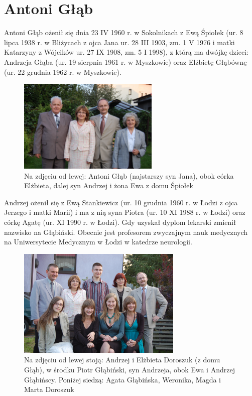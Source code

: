 \section{Antoni Głąb}
Antoni Głąb ożenił się dnia 23 IV 1960 r. w Sokolnikach z Ewą Śpiołek (ur. 8 lipca 1938 r. w Bliżycach z ojca Jana ur. 28 III 1903, zm. 1 V 1976 i matki Katarzyny z Wójcików ur. 27 IX 1908, zm. 5 I 1998), z którą ma dwójkę dzieci: Andrzeja Głąba (ur. 19 sierpnia 1961 r. w Myszkowie) oraz Elżbietę Głąbównę (ur. 22 grudnia 1962 r. w Myszkowie).


\begin{figure}[!h]
\begin{center}
\includegraphics[width=0.6\textwidth]{zdjecia/ewa_antoni_glab_z_dziecmi.jpg}
\caption[Antoni Głąb z żoną i dziećmi]{Na zdjęciu od lewej: Antoni Głąb (najstarszy syn Jana), obok córka Elżbieta, dalej syn Andrzej i żona Ewa z domu Śpiołek}
\label{rys:ewa_antoni_glab_z_dziecmi}
\end{center}
\end{figure}

Andrzej ożenił się z Ewą Stankiewicz (ur. 10 grudnia 1960 r. w Łodzi z ojca Jerzego i matki Marii) i ma z nią syna Piotra (ur. 10 XI 1988 r. w Łodzi) oraz córkę Agatę (ur. XI 1990 r. w Łodzi). Gdy uzyskał dyplom lekarski zmienił nazwisko na Głąbiński. Obecnie jest profesorem zwyczajnym nauk medycznych na Uniwersytecie Medycznym w Łodzi w katedrze neurologii.

\begin{figure}[!h]
\begin{center}
\includegraphics[width=0.7\textwidth]{zdjecia/elzbieta_anrzej_glab_z_dziecmi.jpg}
\caption[Elżbieta Doroszuk i Andrzej Głąbiński z rodzinami]{Na zdjęciu od lewej stoją: Andrzej i Elżbieta Doroszuk (z domu Głąb), w środku Piotr Głąbiński, syn Andrzeja, obok Ewa i Andrzej Głąbińscy. Poniżej siedzą: Agata Głąbińska, Weronika, Magda i Marta Doroszuk}
\label{rys:elzbieta_anrzej_glab_z_dziecmi}
\end{center}
\end{figure}

